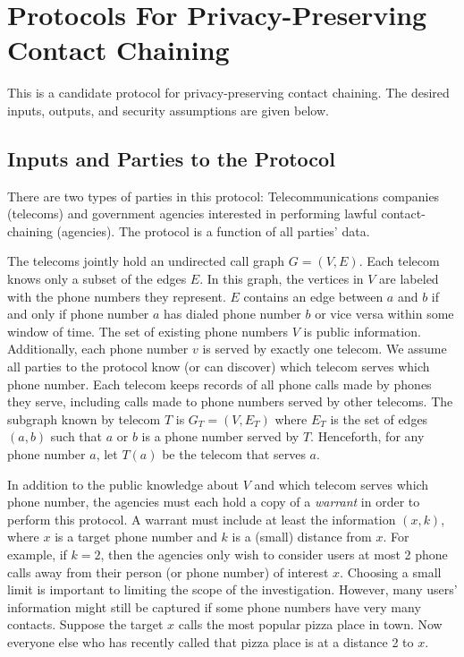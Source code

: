 \section{Protocols For Privacy-Preserving Contact Chaining}

This is a candidate protocol for privacy-preserving contact chaining. The desired inputs, outputs, and security assumptions are given below.

\subsection{Inputs and Parties to the Protocol}

There are two types of parties in this protocol: Telecommunications companies (telecoms) and government agencies interested in performing lawful contact-chaining (agencies). The protocol is a function of all parties' data.

The telecoms jointly hold an undirected call graph $G=(V,E)$. Each telecom knows only a subset of the edges $E$. In this graph, the vertices in $V$ are labeled with the phone numbers they represent. $E$ contains an edge between $a$ and $b$ if and only if phone number $a$ has dialed phone number $b$ or vice versa within some window of time. The set of existing phone numbers $V$ is public information. Additionally, each phone number $v$ is served by exactly one telecom. We assume all parties to the protocol know (or can discover) which telecom serves which phone number. Each telecom keeps records of all phone calls made by phones they serve, including calls made to phone numbers served by other telecoms. The subgraph known by telecom $T$ is $G_T=(V, E_T)$ where $E_T$ is the set of edges $(a, b)$ such that $a$ or $b$ is a phone number served by $T$. Henceforth, for any phone number $a$, let $T(a)$ be the telecom that serves $a$.

In addition to the public knowledge about $V$ and which telecom serves which phone number, the agencies must each hold a copy of a \emph{warrant} in order to perform this protocol. A warrant must include at least the information $(x, k)$, where $x$ is a target phone number and $k$ is a (small) distance from $x$. For example, if $k=2$, then the agencies only wish to consider users at most 2 phone calls away from their person (or phone number) of interest $x$. Choosing a small limit is important to limiting the scope of the investigation. However, many users' information might still be captured if some phone numbers have very many contacts. Suppose the target $x$ calls the most popular pizza place in town. Now everyone else who has recently called that pizza place is at a distance 2 to $x$.


